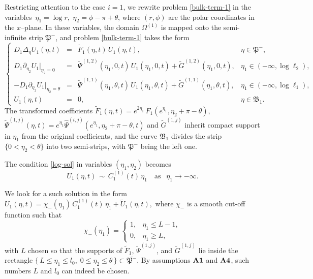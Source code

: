 \documentclass[reqno]{amsart}            %
\numberwithin{equation}{section}
\begin{document}
	
	Restricting attention to the case $i=1$, we rewrite problem \eqref{bulk-term-1} in the variables\ $\eta_1 = \log r,$ $\eta_2 = \phi - \pi + \theta$, where  $(r,\phi)$ are the polar coordinates in the $x$--plane.  In these variables, the domain $\Omega^{(1)}$ is mapped onto the semi-infinite strip $\mathfrak{P}^-$, and problem \eqref{bulk-term-1} takes the form  
	\begin{equation}\label{strip-probl+1}
		\left\{
		\begin{array}{rcll}
			D_1\Delta_\eta U_1(\eta,t) &=& \widetilde{F}_1(\eta,t) \, U_1(\eta,t),
			& \eta\in \mathfrak{P}^-,
			\\[2mm]
			D_1\partial_{\eta_2}{U}_1|_{\eta_2 = 0}  &=& \widetilde{\Psi}^{(1,2)}(\eta_1,0,t)\, U_1(\eta_1,0,t) + \widetilde{G}^{(1,2)}(\eta_1,0,t), & \eta_1 \in (-\infty, \log\ell_2),
			\\[2mm]
			-D_1\partial_{\eta_2}{U}_1|_{\eta_2 = \theta} &=& \widetilde{\Psi}^{(1,1)}(\eta_1,\theta,t)\, U_1(\eta_1,\theta,t) + \widetilde{G}^{(1,1)}(\eta_1,\theta,t), & \eta_1 \in (-\infty, \log\ell_1),
			\\[2mm]
			U_1(\eta,t) &=& 0, & \eta \in \mathfrak{B}_1.
		\end{array}
		\right.
	\end{equation}
	The transformed coefficients $\widetilde{F}_1(\eta,t) = e^{2\eta_1} \, \widehat{F}_1(e^{\eta_1},\eta_2 +\pi - \theta),$
	$\widetilde{\Psi}^{(1,j)}(\eta,t) = e^{\eta_1} \widehat{\Psi}^{(i,j)}(e^{\eta_1},\eta_2 +\pi - \theta,t)$ and 
	$\widetilde{G}^{(1,j)}$ inherit compact support in $\eta_1$ from the original
	coefficients, and the curve $\mathfrak{B}_1$ divides the strip
	$\{0<\eta_2<\theta\}$ into two semi-strips, with $\mathfrak{P}^-$ being the left
	one.
	
	The condition \eqref{log-sol} in variables $(\eta_1,\eta_2)$ becomes
	\begin{equation}\label{asymptotics-1}
		U_1(\eta,t) \, \sim \, C_1^{(1)}(t)\, \eta_1 \quad \text{as } \ \ \eta_1 \to -\infty.
	\end{equation}
	
	We look for a such solution in the form 
	$
	U_1(\eta,t) = \chi_-(\eta_1)\, C_1^{(1)}(t) \, \eta_1 + \widetilde{U}_1(\eta,t),
	$
	where $\chi_-$ is a smooth cut-off function such that
	\[
	\chi_-(\eta_1)=
	\begin{cases}
		1, & \eta_1 \le L - 1,\\
		0, & \eta_1 \ge L,
	\end{cases}
	\]
	with $L$ chosen so that the supports of $\widetilde{F}_1$, $\widetilde{\Psi}^{(1,j)}$,
	and $\widetilde{G}^{(1,j)}$ lie inside the rectangle
	$\{\,L \le \eta_1 \le l_0,\; 0 \le \eta_2 \le \theta\,\} \subset \overline{\mathfrak{P}^-}$.
	By assumptions ${\bf A1}$ and ${\bf A4}$, such numbers $L$ and $l_0$ can indeed be chosen.
	
\end{document}
